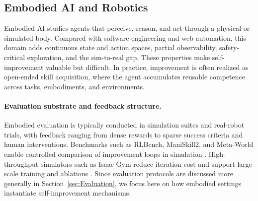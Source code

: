 \subsection{Embodied AI and Robotics}

Embodied AI studies agents that perceive, reason, and act through a physical or simulated body. Compared with software engineering and web automation, this domain adds continuous state and action spaces, partial observability, safety-critical exploration, and the sim-to-real gap. These properties make self-improvement valuable but difficult. In practice, improvement is often realized as open-ended skill acquisition, where the agent accumulates reusable competence across tasks, embodiments, and environments.

\paragraph{Evaluation substrate and feedback structure.}
Embodied evaluation is typically conducted in simulation suites and real-robot trials, with feedback ranging from dense rewards to sparse success criteria and human interventions. Benchmarks such as RLBench, ManiSkill2, and Meta-World enable controlled comparison of improvement loops in simulation \citep{james2019rlbench, gu2023maniskill2unifiedbenchmarkgeneralizable, yu2020meta}. High-throughput simulators such as Isaac Gym reduce iteration cost and support large-scale training and ablations \citep{makoviychuk2021isaac}. Since evaluation protocols are discussed more generally in Section~\ref{sec:Evaluation}, we focus here on how embodied settings instantiate self-improvement mechanisms.

